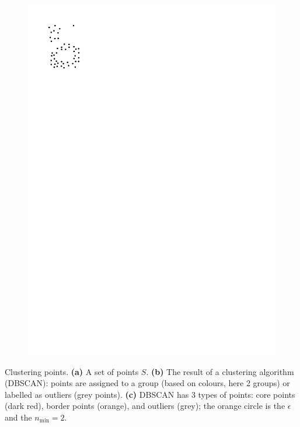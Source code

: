 \begin{marginfigure}
\begin{subfigure}[b]{0.6\linewidth}
    \includegraphics[page=3,width=\textwidth]{figs/clustering.pdf}
    \caption{}
  \end{subfigure}  
\caption{Clustering points. \textbf{(a)} A set of points $S$. \textbf{(b)} The result of a clustering algorithm (DBSCAN): points are assigned to a group (based on colours, here 2 groups) or labelled as outliers (grey points). \textbf{(c)} DBSCAN has 3 types of points: core points (dark red), border points (orange), and outliers (grey); the orange circle is the $\epsilon$ and the $n_{\min} = 2$.}%
\end{marginfigure}

%

